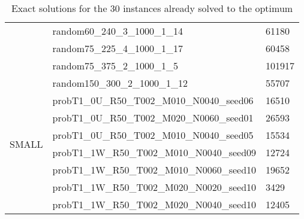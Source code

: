 \begin{table}[]
{\begin{tabular}{@{}lll@{}}
            & random60\_240\_3\_1000\_1\_14              & 61180  \\
            & random75\_225\_4\_1000\_1\_17              & 60458  \\
            & random75\_375\_2\_1000\_1\_5               & 101917 \\
            & random150\_300\_2\_1000\_1\_12             & 55707  \\ \midrule
            \multirow{6}{*}{SMALL} & probT1\_0U\_R50\_T002\_M010\_N0040\_seed06 & 16510  \\
            & probT1\_0U\_R50\_T002\_M020\_N0060\_seed01 & 26593  \\
            & probT1\_0U\_R50\_T002\_M010\_N0040\_seed05 & 15534  \\
            & probT1\_1W\_R50\_T002\_M010\_N0040\_seed09 & 12724  \\
            & probT1\_1W\_R50\_T002\_M010\_N0060\_seed10 & 19652  \\
            & probT1\_1W\_R50\_T002\_M020\_N0020\_seed10 & 3429   \\
            & probT1\_1W\_R50\_T002\_M020\_N0040\_seed10 & 12405  \\ \bottomrule
        \end{tabular}
    }
    \caption{Exact solutions for the 30 instances already solved to the optimum}
    \label{tab:exact_opt}
\end{table}
